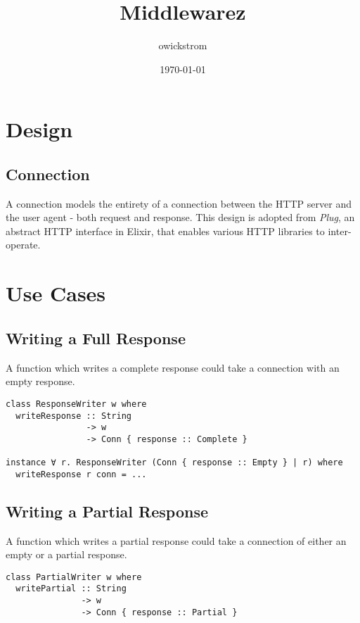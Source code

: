 \documentclass[11pt]{article}
\author{owickstrom}
\date{\today}
\title{Middlewarez}
\begin{document}
\maketitle
\tableofcontents


\section{Design}
\label{sec-1}

\subsection{Connection}
\label{sec-1-1}

A connection models the entirety of a connection between the HTTP server and
the user agent - both request and response. This design is adopted from \emph{Plug},
an abstract HTTP interface in Elixir, that enables various HTTP libraries to
inter-operate.


\section{Use Cases}
\label{sec-2}

\subsection{Writing a Full Response}
\label{sec-2-1}

A function which writes a complete response could take a connection with an
empty response.

\begin{verbatim}
class ResponseWriter w where
  writeResponse :: String
                -> w
                -> Conn { response :: Complete }

instance ∀ r. ResponseWriter (Conn { response :: Empty } | r) where
  writeResponse r conn = ...
\end{verbatim}

\subsection{Writing a Partial Response}
\label{sec-2-2}

A function which writes a partial response could take a connection of either an
empty or a partial response.

\begin{verbatim}
class PartialWriter w where
  writePartial :: String
               -> w
               -> Conn { response :: Partial }
\end{verbatim}
\end{document}
